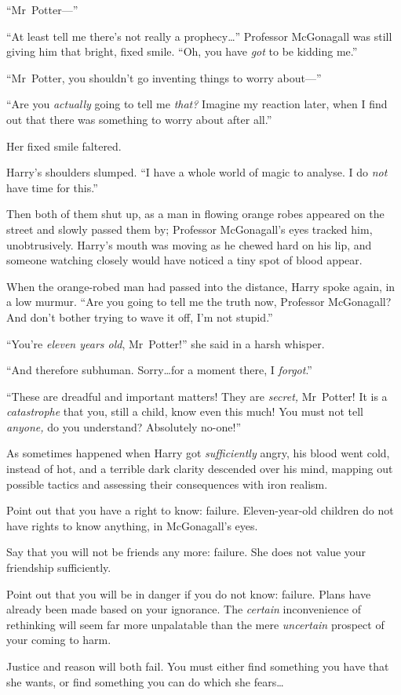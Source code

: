 “Mr~Potter—”

“At least tell me there’s not really a prophecy…” Professor McGonagall was still giving him that bright, fixed smile. “Oh, you have \emph{got} to be kidding me.”

“Mr~Potter, you shouldn’t go inventing things to worry about—”

“Are you \emph{actually} going to tell me \emph{that?} Imagine my reaction later, when I find out that there was something to worry about after all.”

Her fixed smile faltered.

Harry’s shoulders slumped. “I have a whole world of magic to analyse. I do \emph{not} have time for this.”

Then both of them shut up, as a man in flowing orange robes appeared on the street and slowly passed them by; Professor McGonagall’s eyes tracked him, unobtrusively. Harry’s mouth was moving as he chewed hard on his lip, and someone watching closely would have noticed a tiny spot of blood appear.

When the orange-robed man had passed into the distance, Harry spoke again, in a low murmur. “Are you going to tell me the truth now, Professor McGonagall? And don’t bother trying to wave it off, I’m not stupid.”

“You’re \emph{eleven years old}, Mr~Potter!” she said in a harsh whisper.

“And therefore subhuman. Sorry…for a moment there, I \emph{forgot}.”

“These are dreadful and important matters! They are \emph{secret,} Mr~Potter! It is a \emph{catastrophe} that you, still a child, know even this much! You must not tell \emph{anyone,} do you understand? Absolutely no-one!”

As sometimes happened when Harry got \emph{sufficiently} angry, his blood went cold, instead of hot, and a terrible dark clarity descended over his mind, mapping out possible tactics and assessing their consequences with iron realism.

\begin{em}
Point out that you have a right to know: failure. Eleven-year-old children do not have rights to know anything, in McGonagall’s eyes.

Say that you will not be friends any more: failure. She does not value your friendship sufficiently.

Point out that you will be in danger if you do not know: failure. Plans have already been made based on your ignorance. The \emph{certain} inconvenience of rethinking will seem far more unpalatable than the mere \emph{uncertain} prospect of your coming to harm.

Justice and reason will both fail. You must either find something you have that she wants, or find something you can do which she fears…
\end{em}

